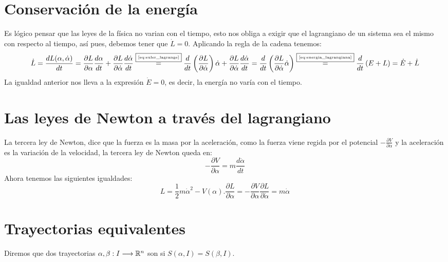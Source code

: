 \section{Conservación de la energía}
Es lógico pensar que las leyes de la física no varian con el tiempo, esto nos obliga a exigir que el lagrangiano de un sistema sea el mismo con respecto al tiempo, así pues, debemos tener que $\dot{L}=0$.
Aplicando la regla de la cadena tenemos:
\begin{equation*}
    \dot{L}=\frac{dL(\alpha, \dot{\alpha})}{dt}=\frac{\partial L}{\partial \alpha}\frac{d\alpha}{dt}+\frac{\partial L}{\partial \dot{\alpha}}\frac{d\dot{\alpha}}{dt}\overset{\fbox{\tiny \ref{eq:euler_lagrange}}}{=}\frac{d}{dt}\left(\frac{\partial L}{\partial \dot{\alpha}}\right)\dot{\alpha}+\frac{\partial L}{\partial \dot{\alpha}}\frac{d\dot{\alpha}}{dt}=\frac{d}{dt}\left(\frac{\partial L}{\partial \dot{\alpha}}\dot{\alpha}\right)\overset{\fbox{\tiny \ref{eq:energia_lagrangiana}}}{=}\frac{d}{dt}\left(E+L\right)=\dot{E}+\dot{L}
\end{equation*}
La igualdad anterior nos lleva a la expresión $\dot{E}=0$, es decir, la energía no varía con el tiempo.


\section{Las leyes de Newton a través del lagrangiano}
La tercera ley de Newton, dice que la fuerza es la masa por la aceleración, como la fuerza viene regida por el potencial $-\frac{\partial V}{\partial\alpha}$ y la aceleración es la variación de la velocidad, la tercera ley de Newton queda en:
\begin{equation*}
    -\frac{\partial V}{\partial\alpha} = m\frac{d\dot{\alpha}}{dt}
\end{equation*}
Ahora tenemos las siguientes igualdades:
\begin{subequations}
    \begin{equation*}
        L=\frac{1}{2}m\dot{\alpha}^2-V(\alpha).
    \end{equation*}
    \begin{equation*}
        \frac{\partial L}{\partial \alpha}=-\frac{\partial V}{\partial \alpha}
    \end{equation*}
    \begin{equation*}
        \frac{\partial L}{\partial\dot{\alpha}}=m\dot{\alpha}
    \end{equation*}
\end{subequations}


\section{Trayectorias equivalentes}
\begin{definition}
    Diremos que dos trayectorias $\alpha,\beta:I\longrightarrow \mathbb{R}^n$ son  si $S(\alpha, I)=S(\beta, I)$.
\end{definition}

